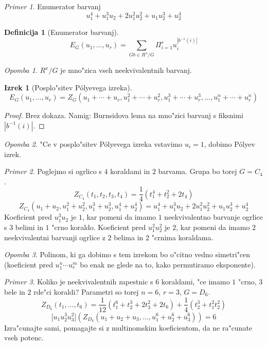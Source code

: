 \documentclass[a4paper,12pt]{article}
\theoremstyle{definition}
\newtheorem{defn}[counter]{Definicija}
\newtheorem{theorem}[counter]{Izrek}
\theoremstyle{remark}
\newtheorem*{ex}{Primer}
\newtheorem*{rem}{Opomba}
\begin{document}
\label{TODO: tega lani ni blo, tkoda ne znam nc dopisat}
\begin{ex}
	Enumerator barvanj
	\[ u_1^4 + u_1^3u_2 + 2u_1^2u_2^2+u_1u_2^3+u_2^4 \]
\end{ex}
\begin{defn}[Enumerator barvanj]
	$$ E_G(u_1, \ldots, u_r) = \sum_{Gb \in R^x/G} \Pi_{i=1}^r u_i^{ |b^{-1}(i)| } $$
\end{defn}
\begin{rem}
	$R^x/G$ je mno"zica vseh neekvivalentnih barvanj.
\end{rem}

\begin{theorem}[Posplo"sitev P\'{o}lyevega izreka]
	\[ E_G(u_1, \ldots, u_r) = Z_G(u_1 + \cdots + u_r, u^2_1 + \cdots + u^2_r, u^3_1 + \cdots + u^3_r, \ldots, u^n_1 + \cdots + u^n_r) \]
\end{theorem}
\begin{proof}
	Brez dokaza. Namig: Burnsidova lema na mno"zici barvanj s fiksnimi $|b^{-1}(i)|$.
\end{proof}
\begin{rem}\label{TODO: elaborate, I don't see it}
	"Ce v posplo"sitev P\'{o}lyevega izreka vstavimo $u_i = 1$, dobimo P\'{o}lyev izrek.
\end{rem}

\begin{ex}
	Poglejmo si ogrlico s $4$ koraldami in $2$ barvama. Grupa bo torej $G = C_4$.
	\[ Z_{C_4}(t_1, t_2, t_3, t_4) = \frac{1}{4}(t_1^4 + t_2^2 + 2t_4) \]
	\[ Z_{C_4}(u_1+u_2, u_1^2+u_2^2, u_1^3+u_2^3, u_1^4+u_2^4) = u_1^4 + u_1^3u_2 + 2u_1^2u_2^2 + u_1u_2^3 + u_2^4\]
	Koeficient pred $u_1^3u_2$ je $1$, kar pomeni da imamo $1$ neekvivalentno barvanje ogrlice s $3$ belimi in $1$ "crno koraldo. Koeficient pred $u_1^2u_2^2$ je $2$, kar pomeni da imamo $2$ neekvivalentni barvanji ogrlice z $2$ belima in $2$ "crnima koraldama.
\end{ex}

\begin{rem}
	Polinom, ki ga dobimo s tem izrekom bo o"citno vedno simetri"cen (koeficient pred $u_1^n\cdots u_r^m$ bo enak ne glede na to, kako permutiramo eksponente).
\end{rem}

\begin{ex}
	Koliko je neekvivalentnih zapestnic s $6$ koraldami, "ce imamo $1$ "crno, $3$ bele in $2$ rde"ci koraldi? Parametri so torej $n=6$, $r=3$, $G=D_6$.
	\[Z_{D_6}(t_1, \ldots, t_6) = \frac{1}{12}(t_1^6+t_2^3+2t_3^2+2t_6)+\frac{1}{4}(t_2^3+t_1^2t_2^2)\]
	\[ \lbrack u_1 u_2^3 u_3^2 \rbrack\left(Z_{D_6}(u_1 + u_2 + u_3, \ldots, u^6_1 + u^6_2 + u^6_3)\right) = 6\]
	Izra"cunajte sami, pomagajte si z multinomskim koeficientom, da ne ra"cunate vseh potenc.
\end{ex}
\end{document}

